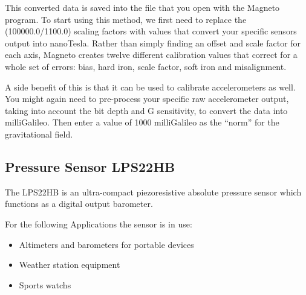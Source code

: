 This converted data is saved into the file   that you open with the Magneto program. To start using this method, we first need to replace the (100000.0/1100.0) scaling factors with values that convert your specific sensors output into nanoTesla. Rather than simply finding an offset and scale factor for each axis, Magneto creates twelve different calibration values that correct for a whole set of errors: bias, hard iron, scale factor, soft iron and misalignment.

A side benefit of this is that it can be used to calibrate accelerometers as well. You might again need to pre-process your specific raw accelerometer output, taking into account the bit depth and G sensitivity, to convert the data into milliGalileo. Then enter a value of 1000 milliGalileo as the ``norm'' for the gravitational field. \cite{Mallon:2015}





\subsection{Pressure Sensor LPS22HB}
The LPS22HB is an ultra-compact piezoresistive absolute pressure sensor which functions as a
digital output barometer.

For the following Applications the sensor is in use:



\begin{itemize}
    \item Altimeters and barometers for portable devices 
    \item Weather station equipment
    \item Sports watchs
\end{itemize}

